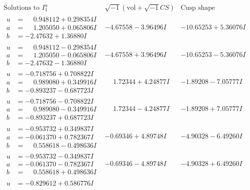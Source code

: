 \documentclass[1p]{elsarticle_modified}
\theoremstyle{definition}
\newcommand{\I}{\sqrt{-1}}
\begin{document}
$$\begin{array}{c|c|c}  
\text{Solutions to }I^u_{1}& \I (\text{vol} + \sqrt{-1}CS) & \text{Cusp shape}\\
 \hline 
\begin{aligned}
u &= \phantom{-}0.948112 + 0.298354 I \\
a &= \phantom{-}1.205050 + 0.065806 I \\
b &= -2.47632 + 1.36880 I\end{aligned}
 & -4.67558 - 3.96496 I & -10.65253 + 5.36076 I \\ \hline\begin{aligned}
u &= \phantom{-}0.948112 - 0.298354 I \\
a &= \phantom{-}1.205050 - 0.065806 I \\
b &= -2.47632 - 1.36880 I\end{aligned}
 & -4.67558 + 3.96496 I & -10.65253 - 5.36076 I \\ \hline\begin{aligned}
u &= -0.718756 + 0.708822 I \\
a &= \phantom{-}0.989080 + 0.349916 I \\
b &= -0.893237 - 0.687723 I\end{aligned}
 & \phantom{-}1.72344 + 4.24877 I & -1.89208 - 7.05777 I \\ \hline\begin{aligned}
u &= -0.718756 - 0.708822 I \\
a &= \phantom{-}0.989080 - 0.349916 I \\
b &= -0.893237 + 0.687723 I\end{aligned}
 & \phantom{-}1.72344 - 4.24877 I & -1.89208 + 7.05777 I \\ \hline\begin{aligned}
u &= -0.953732 + 0.349837 I \\
a &= -0.061370 + 0.782367 I \\
b &= \phantom{-}0.558618 - 0.498636 I\end{aligned}
 & -0.69346 + 4.89748 I & -4.90328 - 6.49260 I \\ \hline\begin{aligned}
u &= -0.953732 - 0.349837 I \\
a &= -0.061370 - 0.782367 I \\
b &= \phantom{-}0.558618 + 0.498636 I\end{aligned}
 & -0.69346 - 4.89748 I & -4.90328 + 6.49260 I \\ \hline\begin{aligned}
u &= -0.829612 + 0.586776 I \\

\end{aligned}
\end{array}$$
\end{document}
